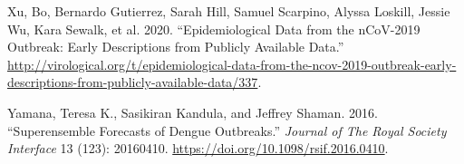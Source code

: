 \documentclass[
]{article}
\newlength{\cslhangindent}
\newlength{\cslentryspacingunit} %
\newenvironment{CSLReferences}[2] %
 {%
  \setlength{\parindent}{0pt}
  \ifodd #1
  \let\oldpar\par
  \def\par{\hangindent=\cslhangindent\oldpar}
  \fi
  \setlength{\parskip}{#2\cslentryspacingunit}
 }%
 {}
\begin{document}
\begin{CSLReferences}{1}{0}
\leavevmode{}%
Xu, Bo, Bernardo Gutierrez, Sarah Hill, Samuel Scarpino, Alyssa Loskill, Jessie Wu, Kara Sewalk, et al. 2020. {``Epidemiological Data from the nCoV-2019 Outbreak: Early Descriptions from Publicly Available Data.''} \url{http://virological.org/t/epidemiological-data-from-the-ncov-2019-outbreak-early-descriptions-from-publicly-available-data/337}.

\leavevmode{}%
Yamana, Teresa K., Sasikiran Kandula, and Jeffrey Shaman. 2016. {``Superensemble Forecasts of Dengue Outbreaks.''} \emph{Journal of The Royal Society Interface} 13 (123): 20160410. \url{https://doi.org/10.1098/rsif.2016.0410}.

\end{CSLReferences}
\end{document}
